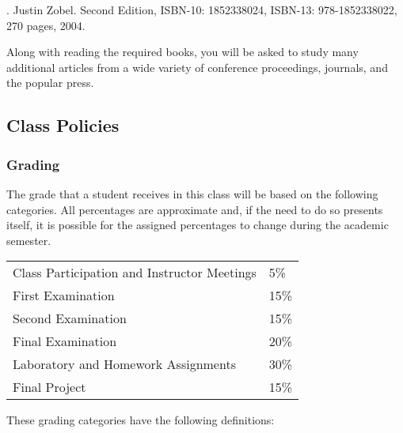 .  Justin Zobel. Second Edition,  ISBN-10: 1852338024, ISBN-13:
978-1852338022, 270 pages, 2004.

\noindent
Along with reading the required books, you will be asked to study many additional articles from a wide variety of
conference proceedings, journals, and the popular press.

\subsection*{Class Policies}

\subsubsection*{Grading}

The grade that a student receives in this class will be based on the following categories. All percentages are
approximate and, if the need to do so presents itself, it is possible for the assigned percentages to change during the
academic semester. 

\begin{center}
  \begin{tabular}{ll}
    Class Participation and Instructor Meetings & 5\% \\
    First Examination & 15\% \\
    Second Examination & 15\% \\
    Final Examination & 20\% \\
    Laboratory and Homework Assignments & 30\% \\
    Final Project & 15\%
  \end{tabular}
\end{center}

\vspace*{-.1in}
\noindent
These grading categories have the following definitions:
\vspace*{-.1in}


